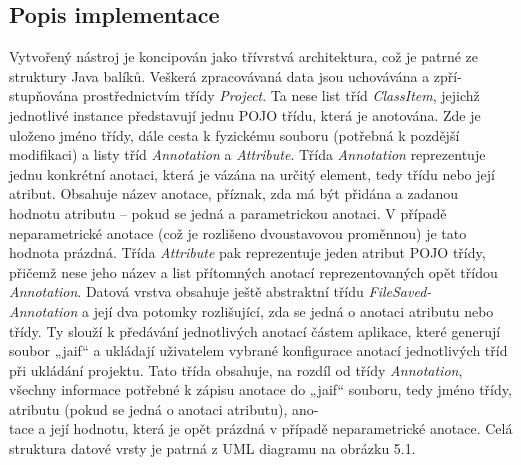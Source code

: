 \documentclass{projekt}
\begin{document}
\subsection{Popis implementace}
\hspace{0.65cm}Vytvořený nástroj je koncipován jako třívrstvá architektura, což je patrné ze struktury Java balíků.
Veškerá zpracovávaná data jsou uchovávána a zpří-\\stupňována prostřednictvím třídy {\it Project}. Ta nese list tříd {\it ClassItem}, jejichž jednotlivé instance představují jednu POJO třídu, která je anotována. Zde je uloženo jméno třídy, dále cesta k fyzickému souboru (potřebná k pozdější modifikaci) a listy tříd {\it Annotation} a {\it Attribute}. Třída {\it Annotation} reprezentuje jednu konkrétní anotaci, která je vázána na určitý element, tedy třídu nebo její atribut. Obsahuje název anotace, příznak, zda má být přidána a zadanou hodnotu atributu – pokud se jedná a parametrickou anotaci. V případě neparametrické anotace (což je rozlišeno dvoustavovou proměnnou) je tato hodnota prázdná. Třída {\it Attribute} pak reprezentuje jeden atribut POJO třídy, přičemž nese jeho název a list přítomných anotací reprezentovaných opět třídou {\it Annotation}. 
Datová vrstva obsahuje ještě abstraktní třídu {\it FileSaved-\\Annotation} a její dva potomky rozlišující, zda se jedná o anotaci atributu nebo třídy. Ty slouží k předávání jednotlivých anotací částem aplikace, které generují soubor „jaif“ a ukládají uživatelem vybrané konfigurace anotací jednotlivých tříd při ukládání projektu. Tato třída obsahuje, na rozdíl od třídy {\it Annotation}, všechny informace potřebné k zápisu anotace do „jaif“ souboru, tedy jméno třídy, atributu (pokud se jedná o anotaci atributu), ano-\\tace a její hodnotu, která je opět prázdná v případě neparametrické anotace. Celá struktura datové vrsty je patrná z UML diagramu na obrázku 5.1.
\vspace{1.0cm}
\end{document}

